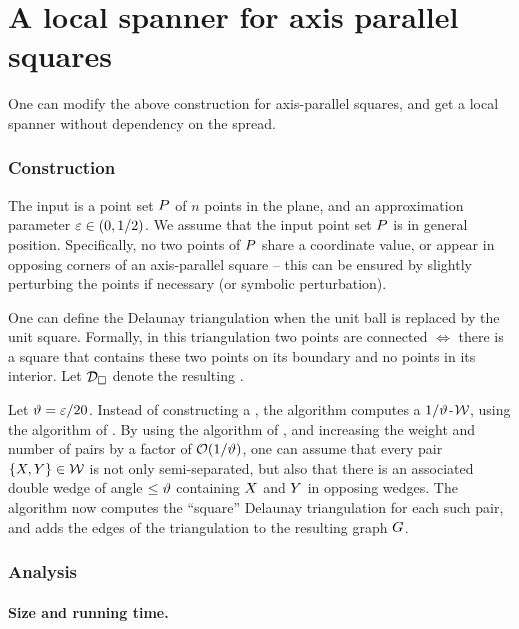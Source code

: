 \documentclass[12pt]{article}%
\begin{document}
\section{A local spanner for axis parallel squares}
One can modify the above construction for axis-parallel squares, and
get a local spanner without dependency on the spread.

\subsubsection{Construction}

The input is a point set $P$ of $n$ points in the plane, and an
approximation parameter $\varepsilon \in (0,1/2)$.  We assume that the input
point set $P$ is in general position. Specifically, no two points of
$P$ share a coordinate value, or appear in opposing corners of an
axis-parallel square -- this can be ensured by slightly perturbing the
points if necessary (or symbolic perturbation).


One can define the Delaunay triangulation when the unit ball is
replaced by the unit square. Formally, in this triangulation two
points are connected $\iff$ there is a square that contains these two
points on its boundary and no points in its interior. Let
$\mathcal{D}_\square$ denote the resulting .

Let $\vartheta = \varepsilon/20$.  Instead of constructing a \WSPD, the algorithm
computes a $1/\vartheta$-\SSPD $\mathcal{W}$, using the algorithm of
. By using the algorithm of , and increasing the weight and number of pairs by a
factor of $\mathcal{O}(1/\vartheta)$,
one can assume that every pair $\{ X, Y \} \in \mathcal{W}$ is not only
semi-separated, but also that there is an associated double wedge of angle
$\leq \vartheta$ containing $X$ and $Y$ in opposing wedges.  The algorithm now computes the ``square'' Delaunay
triangulation for each such pair, and adds the edges of the
triangulation to the resulting graph $G$.



\subsubsection{Analysis}

\paragraph{Size and running time.}
\end{document}
